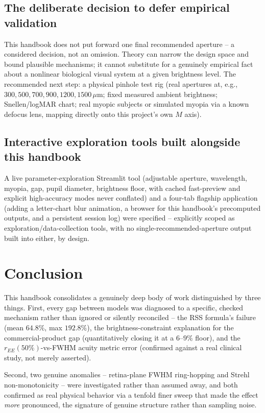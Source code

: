 \documentclass[11pt]{report}
\begin{document}
\section{The deliberate decision to defer empirical validation}
This handbook does not put forward one final recommended aperture -- a considered decision, not an omission. Theory can narrow the design space and bound plausible mechanisms; it cannot substitute for a genuinely empirical fact about a nonlinear biological visual system at a given brightness level. The recommended next step: a physical pinhole test rig (real apertures at, e.g., $300,500,700,900,1200,1500\,\mu$m; fixed measured ambient brightness; Snellen/logMAR chart; real myopic subjects or simulated myopia via a known defocus lens, mapping directly onto this project's own $M$ axis).

\section{Interactive exploration tools built alongside this handbook}
A live parameter-exploration Streamlit tool (adjustable aperture, wavelength, myopia, gap, pupil diameter, brightness floor, with cached fast-preview and explicit high-accuracy modes never conflated) and a four-tab flagship application (adding a letter-chart blur animation, a browser for this handbook's precomputed outputs, and a persistent session log) were specified -- explicitly scoped as exploration/data-collection tools, with no single-recommended-aperture output built into either, by design.

\chapter{Conclusion}

This handbook consolidates a genuinely deep body of work distinguished by three things. First, every gap between models was diagnosed to a specific, checked mechanism rather than ignored or silently reconciled -- the RSS formula's failure (mean $64.8\%$, max $192.8\%$), the brightness-constraint explanation for the commercial-product gap (quantitatively closing it at a $6$--$9\%$ floor), and the $r_{EE}(50\%)$-vs-FWHM acuity metric error (confirmed against a real clinical study, not merely asserted).

Second, two genuine anomalies -- retina-plane FWHM ring-hopping and Strehl non-monotonicity -- were investigated rather than assumed away, and both confirmed as real physical behavior via a tenfold finer sweep that made the effect \emph{more} pronounced, the signature of genuine structure rather than sampling noise.
\end{document}
